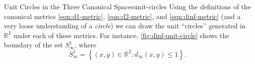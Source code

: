 \documentclass{article}
\numberwithin{equation}{section}
\numberwithin{figure}{section}
\begin{document}
\begin{example}{Unit Circles in the Three Canonical Spaces}{unit-circles}
    Using the definitions of the canonical metrics \cref{eqn:d1-metric},
    \cref{eqn:d2-metric}, and \cref{eqn:dinf-metric} (and a very loose
    understanding of a \emph{circle}) we can draw the unit ``circles'' generated
    in $ \mathbb{R}^2 $ under each of these metrics. For instance,
    \cref{fig:dinf-unit-circle} shows the boundary of the set $ S^1_\infty $,
    where
    \begin{equation}
        S^1_\infty = \left\{ (x, y) \in \mathbb{R}^2 \colon d_\infty(x, y) \leq
        1 \right\}.
    \end{equation}

    \begin{minipage}{.3\linewidth}
        \centering
        \label{fig:d1-unit-circle}
    \end{minipage}\hfill
    \begin{minipage}{.3\linewidth}
        \centering
        \label{fig:d2-unit-circle}
    \end{minipage}\hfill
    \begin{minipage}{.3\linewidth}
        \centering
        \label{fig:dinf-unit-circle}
    \end{minipage}
\end{example}
\end{document}
